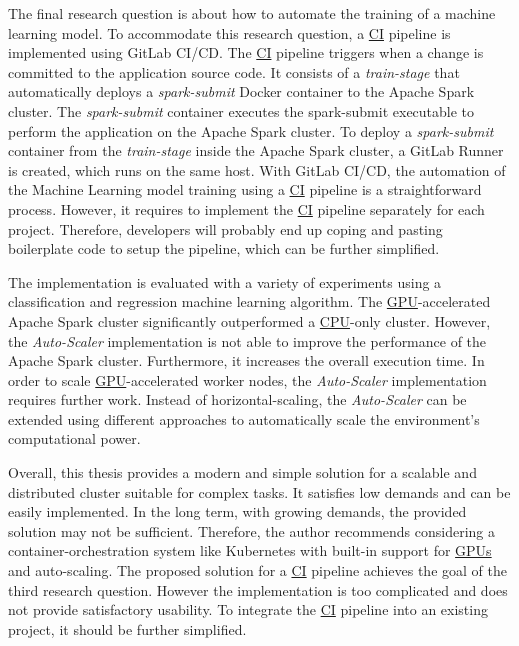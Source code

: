 The final research question is about how to automate the training of a machine learning model.
%
To accommodate this research question, a \hyperlink{abbr:ci}{CI} pipeline is implemented using GitLab CI/CD. The \hyperlink{abbr:ci}{CI} pipeline triggers when a change is committed to the application source code.
It consists of a \textit{train-stage} that automatically deploys a \textit{spark-submit} Docker container to the Apache Spark cluster.
The \textit{spark-submit} container executes the spark-submit executable to perform the application on the Apache Spark cluster.
To deploy a \textit{spark-submit} container from the \textit{train-stage} inside the Apache Spark cluster, a GitLab Runner is created, which runs on the same host.
With GitLab CI/CD, the automation of the Machine Learning model training using a \hyperlink{abbr:ci}{CI} pipeline is a straightforward process. However, it requires to implement the \hyperlink{abbr:ci}{CI} pipeline separately for each project. Therefore, developers will probably end up coping and pasting boilerplate code to setup the pipeline, which can be further simplified.


The implementation is evaluated with a variety of experiments using a classification and regression machine learning algorithm.
The \hyperlink{abbr:gpu}{GPU}-accelerated Apache Spark cluster significantly outperformed a \hyperlink{abbr:cpu}{CPU}-only cluster.
However, the \textit{Auto-Scaler} implementation is not able to improve the performance of the Apache Spark cluster. Furthermore, it increases the overall execution time. In order to scale \hyperlink{abbr:gpu}{GPU}-accelerated worker nodes, the \textit{Auto-Scaler} implementation requires further work. Instead of horizontal-scaling, the \textit{Auto-Scaler} can be extended using different approaches to automatically scale the environment's computational power.


Overall, this thesis provides a modern and simple solution for a scalable and distributed cluster suitable for complex tasks. It satisfies low demands and can be easily implemented. In the long term, with growing demands, the provided solution may not be sufficient. Therefore, the author recommends considering a container-orchestration system like Kubernetes with built-in support for \hyperlink{abbr:gpu}{GPUs} and auto-scaling. The proposed solution for a \hyperlink{abbr:ci}{CI} pipeline achieves the goal of the third research question. However the implementation is too complicated and does not provide satisfactory usability. To integrate the \hyperlink{abbr:ci}{CI} pipeline into an existing project, it should be further simplified.


